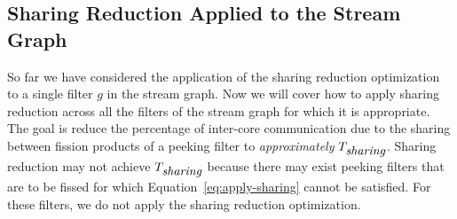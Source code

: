 







\subsection{Sharing Reduction Applied to the Stream Graph}
So far we have considered the application of the sharing reduction
optimization to a single filter $g$ in the stream graph.  Now we will
cover how to apply sharing reduction across all the filters of the
stream graph for which it is appropriate.  The goal is reduce the
percentage of inter-core communication due to the sharing between
fission products of a peeking filter to {\it approximately}
$T_{\mbox{\it sharing}}$.  Sharing reduction may not achieve
$T_{\mbox{\it sharing}}$ because there may exist peeking filters that are to
be fissed for which Equation~\ref{eq:apply-sharing} cannot be
satisfied.  For these filters, we do not apply the sharing reduction
optimization.

